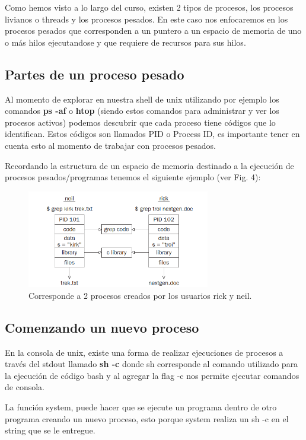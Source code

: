 \documentclass[journal]{IEEEtai}
\begin{document}
Como hemos visto a lo largo del curso, existen 2 tipos de procesos, los procesos livianos o threads y los procesos pesados.
En este caso nos enfocaremos en los procesos pesados que corresponden a un puntero a un espacio de memoria de uno o más hilos ejecutandose y que requiere de recursos para sus hilos.

\subsection{Partes de un proceso pesado}

Al momento de explorar en nuestra shell de unix utilizando por ejemplo los comandos \textbf{ps -af} o \textbf{htop} (siendo estos comandos para administrar y ver los procesos activos) podemos descubrir que cada proceso tiene códigos que lo identifican. Estos códigos son llamados PID o Process ID, es importante tener en cuenta esto al momento de trabajar con procesos pesados.

Recordando la estructura de un espacio de memoria destinado a la ejecución de procesos pesados/programas tenemos el siguiente ejemplo (ver Fig. 4):

\begin{figure}[H]
\centering
\includegraphics[width=8cm]{img/PID.png}
\caption{Corresponde a 2 procesos creados por los usuarios rick y neil.}
\label{fig}
\end{figure}

\subsection{Comenzando un nuevo proceso}

En la consola de unix, existe una forma de realizar ejecuciones de procesos a través del stdout llamado \textbf{sh -c} donde sh corresponde al comando utilizado para la ejecución de código bash y al agregar la flag -c nos permite ejecutar comandos de consola.



La función system, puede hacer que se ejecute un programa dentro de otro programa creando un nuevo proceso, esto porque system realiza un sh -c en el string que se le entregue.
\end{document}
